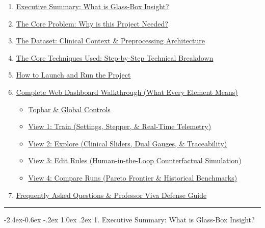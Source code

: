 \documentclass[10pt,a4paper]{article}
\makeatletter
\renewcommand\subsection{\@startsection{subsection}{2}{\z@}%
                                     {-2.4ex\@plus -0.6ex \@minus -.2ex}%
                                     {1.0ex \@plus .2ex}%
                                     {\normalfont\large\bfseries\color{primary}}}
\providecommand{\tightlist}{\setlength{\itemsep}{1pt}\setlength{\parskip}{1pt}}
\makeatother
\begin{document}
\begin{enumerate}
\def\labelenumi{\arabic{enumi}.}
\tightlist
\item
  \hyperref[1-executive-summary-what-is-glass-box-insight]{Executive
  Summary: What is Glass-Box Insight?}
\item
  \hyperref[2-the-core-problem-why-is-this-project-needed]{The Core
  Problem: Why is this Project Needed?}
\item
  \hyperref[3-the-dataset-clinical-context--preprocessing-architecture]{The
  Dataset: Clinical Context \& Preprocessing Architecture}
\item
  \hyperref[4-the-core-techniques-used-step-by-step-technical-breakdown]{The
  Core Techniques Used: Step-by-Step Technical Breakdown}
\item
  \hyperref[5-how-to-launch-and-run-the-project]{How to Launch and Run
  the Project}
\item
  \hyperref[6-complete-web-dashboard-walkthrough-what-every-element-means]{Complete
  Web Dashboard Walkthrough (What Every Element Means)}

  \begin{itemize}
  \tightlist
  \item
    \hyperref[topbar--global-controls]{Topbar \& Global Controls}
  \item
    \hyperref[view-1-train-settings-stepper--real-time-telemetry]{View
    1: Train (Settings, Stepper, \& Real-Time Telemetry)}
  \item
    \hyperref[view-2-explore-clinical-sliders-dual-gauges--traceability]{View
    2: Explore (Clinical Sliders, Dual Gauges, \& Traceability)}
  \item
    \hyperref[view-3-edit-rules-human-in-the-loop-counterfactual-simulation]{View
    3: Edit Rules (Human-in-the-Loop Counterfactual Simulation)}
  \item
    \hyperref[view-4-compare-runs-pareto-frontier--historical-benchmarks]{View
    4: Compare Runs (Pareto Frontier \& Historical Benchmarks)}
  \end{itemize}
\item
  \hyperref[7-frequently-asked-questions--professor-viva-defense-guide]{Frequently
  Asked Questions \& Professor Viva Defense Guide}
\end{enumerate}

\begin{center}\rule{0.5\linewidth}{0.5pt}\end{center}

\subsection{1. Executive Summary: What is Glass-Box
Insight?}\label{executive-summary-what-is-glass-box-insight}
\end{document}
